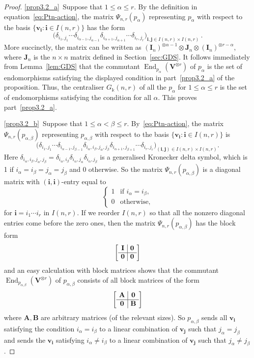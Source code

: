 \documentclass[ALCO,ThmDefs,Unicode,epreuves]{cedram}
\DeclareMathOperator{\End}{End}
\newcommand{\bi}{{\boldsymbol{i}}} %
\newcommand{\bj}{{\boldsymbol{j}}}
\newcommand{\bA}{\mathbf{A}}
\newcommand{\bB}{\mathbf{B}}
\newcommand{\bJ}{\mathbf{J}}
\newcommand{\bI}{\mathbf{I}}
\newcommand{\bzero}{\mathbf{0}}
\newcommand{\V}{\mathbf{V}} %
\newcommand{\bv}{\mathbf{v}} %
\begin{document}
\begin{proof}
%
\ref{prop3.2_a}~Suppose that $1 \le \alpha \le r$. By the definition in equation~\eqref{eq:Ptn-action}, the matrix $\Psi_{n,r}(p_{\alpha})$ representing $p_{\alpha}$ with respect to the basis $\{\bv_\bi : \bi \in I(n,r)\}$ has the form
\[
\big( \delta_{i_1,j_1} \cdots \delta_{i_{\alpha-1}, j_{\alpha-1}}
\delta_{i_{\alpha+1}, j_{\alpha+1}} \cdots \delta_{i_r, j_r} \big)_{\bi,\bj
 \in I(n,r) \times I(n,r)} \, .
\]
More succinctly, the matrix can be written as $(\bI_n)^{\otimes
 \alpha-1} \otimes \bJ_n \otimes (\bI_n)^{\otimes r-\alpha}$, where
$\bJ_n$ is the $n \times n$ matrix defined in Section~\ref{sec:GDS}. It follows immediately from Lemma~\ref{lem:GDS} that
the commutant $\End_{p_\alpha}(\V^{\otimes r})$ of $p_\alpha$
is the set of endomorphisms satisfying the displayed condition in part~\ref{prop3.2_a} of the proposition. Thus, the centraliser $G_\Bbbk(n,r)$ of all
the $p_\alpha$ for $1 \le \alpha \le r$ is the set of endomorphisms
satisfying the condition for all $\alpha$. This proves part~\ref{prop3.2_a}.
 
\ref{prop3.2_b}~Suppose that $1 \le \alpha < \beta \le r$. By~\eqref{eq:Ptn-action}, the matrix $\Psi_{n,r}(p_{\alpha,\beta})$
representing $p_{\alpha,\beta}$ with respect to the basis $\{\bv_\bi :
\bi \in I(n,r)\}$ is
\[
\big( \delta_{i_{1},j_{1}} \cdots \delta_{i_{\alpha-1},j_{\beta-1}}
\delta_{i_\alpha, i_\beta, j_\alpha, j_\beta} \delta_{i_{\alpha+1},j_{\beta+1}} \cdots
\delta_{i_r,j_r} \big)_{(\bi,\bj) \in I(n,r) \times I(n,r)}.
\]
Here $\delta_{i_\alpha, i_\beta, j_\alpha, j_\beta} = \delta_{i_\alpha,
 i_\beta} \delta_{i_\alpha, j_\alpha} \delta_{i_\alpha, j_\beta}$ is a
generalised Kronecker delta symbol, which is 1 if
$i_\alpha=i_\beta=j_\alpha=j_\beta$ and 0 otherwise. So the matrix
$\Psi_{n,r}(p_{\alpha,\beta})$ is a diagonal matrix with
$(\bi,\bi)$-entry equal to
\[
\begin{cases}
 1 & \text{if } i_\alpha
 = i_\beta ,\\
 0 & \text{otherwise},
\end{cases}
\]
for $\bi = i_1 \cdots i_r$ in $I(n,r)$. If we reorder $I(n,r)$ so
that all the nonzero diagonal entries come before the zero ones, then
the matrix $\Psi_{n,r}(p_{\alpha,\beta})$ has the block form
 \[
\setlength{\arraycolsep}{4pt}
 \left[\begin{array}{c|c} {\bI} & \bzero \\ \hline \bzero &
 \bzero\end{array}\right]
 \]
and an easy calculation with block matrices shows that the commutant
$\End_{p_{\alpha,\beta}}(\V^{\otimes r})$ of $p_{\alpha,\beta}$
consists of all block matrices of the form
 \[
\setlength{\arraycolsep}{4pt}
 \left[\begin{array}{c|c}
 \bA & \bzero \\ \hline \bzero & \bB
 \end{array}\right]
 \]
where $\bA, \bB $ are arbitrary matrices (of the relevant sizes). So
$p_{\alpha,\beta}$ sends all $\bv_\bi$ satisfying the condition
$i_\alpha = i_\beta$ to a linear combination of $\bv_\bj$ such that
$j_\alpha = j_\beta$ and sends the $\bv_\bi$ satisfying $i_\alpha \ne
i_\beta$ to a linear combination of $\bv_\bj$ such that $j_\alpha \ne
j_\beta$.


\end{proof}
\end{document}
